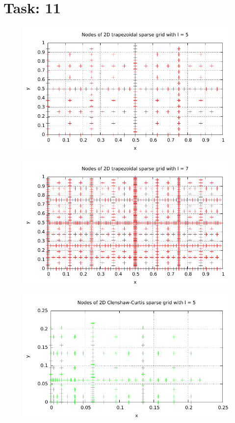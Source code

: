 \documentclass{article}
\begin{document}
\section*{Task: 11}

\begin{figure}[htbp]
  \centering
     \includegraphics[width=1.0\textwidth]{../Task11/sh3_task11_point_plot_trapezoidal_l=5.pdf}
\end{figure}

\begin{figure}[htbp]
  \centering
     \includegraphics[width=1.0\textwidth]{../Task11/sh3_task11_point_plot_trapezoidal_l=7.pdf}
\end{figure}

\begin{figure}[htbp]
  \centering
     \includegraphics[width=1.0\textwidth]{../Task11/sh3_task11_point_plot_clenshawCurtis_l=5.pdf}
\end{figure}
\end{document}
